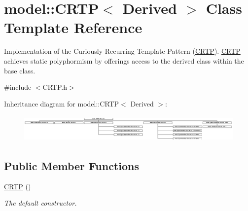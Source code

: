\hypertarget{classmodel_1_1_c_r_t_p}{}\section{model\+:\+:C\+R\+T\+P$<$ Derived $>$ Class Template Reference}
\label{classmodel_1_1_c_r_t_p}


Implementation of the Curiously Recurring Template Pattern (\hyperlink{classmodel_1_1_c_r_t_p}{C\+R\+T\+P}). \hyperlink{classmodel_1_1_c_r_t_p}{C\+R\+T\+P} achieves static polyphormism by offerings access to the derived class within the base class.  




{\ttfamily \#include $<$C\+R\+T\+P.\+h$>$}

Inheritance diagram for model\+:\+:C\+R\+T\+P$<$ Derived $>$\+:\begin{figure}[H]
\begin{center}
\leavevmode
\includegraphics[height=1.415929cm]{classmodel_1_1_c_r_t_p}
\end{center}
\end{figure}
\subsection*{Public Member Functions}
\begin{DoxyCompactItemize}
\item 
\hyperlink{classmodel_1_1_c_r_t_p_a85d022c5e2e136a890a7de1eab854ee7}{C\+R\+T\+P} ()
\begin{DoxyCompactList}\small\item\em The default constructor. \end{DoxyCompactList}\end{DoxyCompactItemize}
